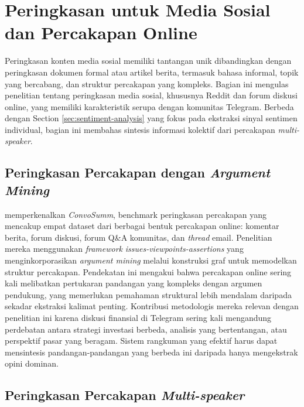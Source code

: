 \section{Peringkasan untuk Media Sosial dan Percakapan Online}
\label{sec:social-media-summarization}

Peringkasan konten media sosial memiliki tantangan unik dibandingkan dengan peringkasan dokumen formal atau artikel berita, termasuk bahasa informal, topik yang bercabang, dan struktur percakapan yang kompleks. Bagian ini mengulas penelitian tentang peringkasan media sosial, khususnya Reddit dan forum diskusi online, yang memiliki karakteristik serupa dengan komunitas Telegram. Berbeda dengan Section \ref{sec:sentiment-analysis} yang fokus pada ekstraksi sinyal sentimen individual, bagian ini membahas sintesis informasi kolektif dari percakapan \textit{multi-speaker}.

\subsection{Peringkasan Percakapan dengan \textit{Argument Mining}}

\textcite{fabbri2021} memperkenalkan \textit{ConvoSumm}, benchmark peringkasan percakapan yang mencakup empat dataset dari berbagai bentuk percakapan online: komentar berita, forum diskusi, forum Q\&A komunitas, dan \textit{thread} email. Penelitian mereka menggunakan \textit{framework} \textit{issues-viewpoints-assertions} yang menginkorporasikan \textit{argument mining} melalui konstruksi graf untuk memodelkan struktur percakapan. Pendekatan ini mengakui bahwa percakapan online sering kali melibatkan pertukaran pandangan yang kompleks dengan argumen pendukung, yang memerlukan pemahaman struktural lebih mendalam daripada sekadar ekstraksi kalimat penting. Kontribusi metodologis mereka relevan dengan penelitian ini karena diskusi finansial di Telegram sering kali mengandung perdebatan antara strategi investasi berbeda, analisis yang bertentangan, atau perspektif pasar yang beragam. Sistem rangkuman yang efektif harus dapat mensintesis pandangan-pandangan yang berbeda ini daripada hanya mengekstrak opini dominan.

\subsection{Peringkasan Percakapan \textit{Multi-speaker}}

